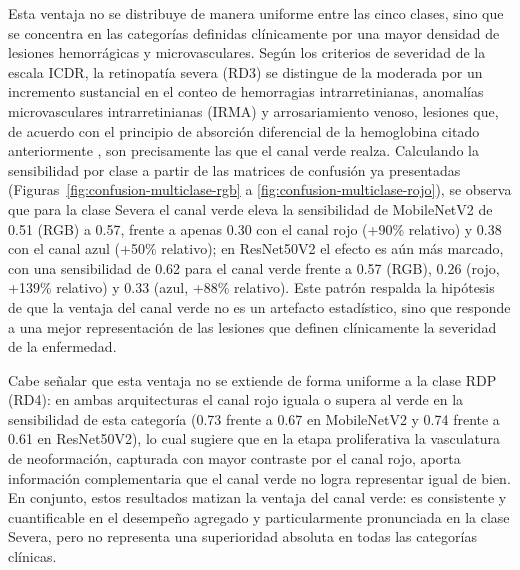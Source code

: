 Esta ventaja no se distribuye de manera uniforme entre las cinco clases, sino que se
concentra en las categorías definidas clínicamente por una mayor densidad de lesiones
hemorrágicas y microvasculares. Según los criterios de severidad de la escala ICDR, la
retinopatía severa (RD3) se distingue de la moderada por un incremento sustancial en el
conteo de hemorragias intrarretinianas, anomalías microvasculares intrarretinianas (IRMA)
y arrosariamiento venoso, lesiones que, de acuerdo con el principio de absorción
diferencial de la hemoglobina citado anteriormente , son
precisamente las que el canal verde realza. Calculando la sensibilidad por clase a partir
de las matrices de confusión ya presentadas (Figuras~\ref{fig:confusion-multiclase-rgb} a
\ref{fig:confusion-multiclase-rojo}), se observa que para la clase Severa el canal verde
eleva la sensibilidad de MobileNetV2 de 0.51 (RGB) a 0.57, frente a apenas 0.30 con el
canal rojo (+90\% relativo) y 0.38 con el canal azul (+50\% relativo); en ResNet50V2 el
efecto es aún más marcado, con una sensibilidad de 0.62 para el canal verde frente a 0.57
(RGB), 0.26 (rojo, +139\% relativo) y 0.33 (azul, +88\% relativo). Este patrón respalda la
hipótesis de que la ventaja del canal verde no es un artefacto estadístico, sino que
responde a una mejor representación de las lesiones que definen clínicamente la severidad
de la enfermedad.

Cabe señalar que esta ventaja no se extiende de forma uniforme a la clase RDP (RD4): en
ambas arquitecturas el canal rojo iguala o supera al verde en la sensibilidad de esta
categoría (0.73 frente a 0.67 en MobileNetV2 y 0.74 frente a 0.61 en ResNet50V2), lo cual
sugiere
que en la etapa proliferativa la vasculatura de neoformación, capturada con mayor
contraste por el canal rojo, aporta información complementaria que el canal verde no
logra representar igual de bien. En conjunto, estos resultados matizan la ventaja del
canal verde: es consistente y cuantificable en el desempeño agregado y particularmente
pronunciada en la clase Severa, pero no representa una superioridad absoluta en todas las
categorías clínicas.


